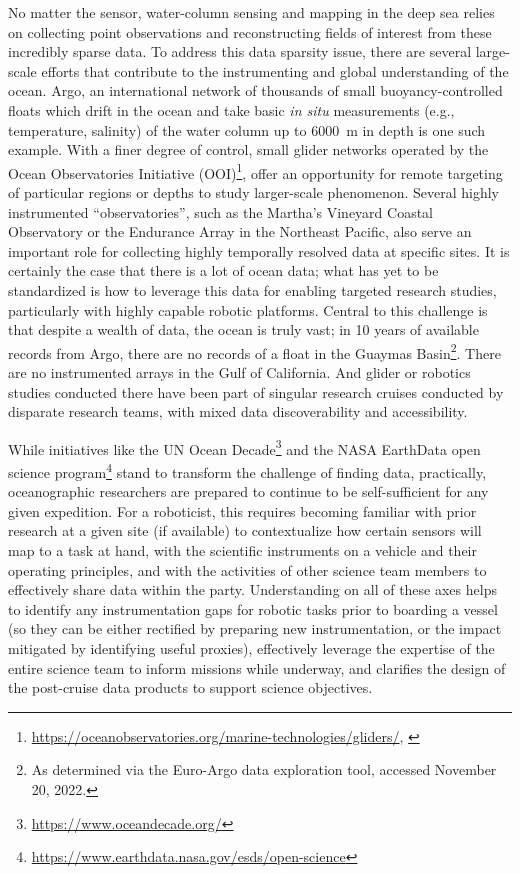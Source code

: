 No matter the sensor, water-column sensing and mapping in the deep sea relies on collecting point observations and reconstructing fields of interest from these incredibly sparse data.
To address this data sparsity issue, there are several large-scale efforts that contribute to the instrumenting and global understanding of the ocean. Argo, an international network of thousands of small buoyancy-controlled floats which drift in the ocean and take basic \emph{in situ} measurements (e.g., temperature, salinity) of the water column up to \SI{6000}{\meter} in depth is one such example\autocite{roemmich2009argo,jayne2017argo}. With a finer degree of control, small glider networks operated by the Ocean Observatories Initiative (OOI)\footnote{\url{https://oceanobservatories.org/marine-technologies/gliders/}, \autocite{trowbridge2019ocean}}, offer an opportunity for remote targeting of particular regions or depths to study larger-scale phenomenon. Several highly instrumented ``observatories'', such as the Martha's Vineyard Coastal Observatory\autocite{austin2000martha} or the Endurance Array in the Northeast Pacific\autocite{barth2018warm}, also serve an important role for collecting highly temporally resolved data at specific sites. It is certainly the case that there is a lot of ocean data; what has yet to be standardized is how to leverage this data for enabling targeted research studies, particularly with highly capable robotic platforms. Central to this challenge is that despite a wealth of data, the ocean is truly vast; in 10 years of available records from Argo, there are no records of a float in the Guaymas Basin\footnote{As determined via the Euro-Argo data exploration tool, accessed November 20, 2022.}. There are no instrumented arrays in the Gulf of California. And glider or robotics studies conducted there have been part of singular research cruises conducted by disparate research teams, with mixed data discoverability and accessibility. 

While initiatives like the UN Ocean Decade\footnote{\url{https://www.oceandecade.org/}} and the NASA EarthData open science program\footnote{\url{https://www.earthdata.nasa.gov/esds/open-science}} stand to transform the challenge of finding data, practically, oceanographic researchers are prepared to continue to be self-sufficient for any given expedition.
For a roboticist, this requires becoming familiar with prior research at a given site (if available) to contextualize how certain sensors will map to a task at hand, with the scientific instruments on a vehicle and their operating principles, and with the activities of other science team members to effectively share data within the party. Understanding on all of these axes helps to identify any instrumentation gaps for robotic tasks prior to boarding a vessel (so they can be either rectified by preparing new instrumentation, or the impact mitigated by identifying useful proxies), effectively leverage the expertise of the entire science team to inform missions while underway, and clarifies the design of the post-cruise data products to support science objectives.

